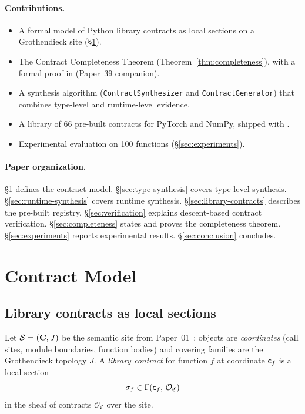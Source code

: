 \documentclass[11pt]{article}
\newcommand{\ContractSpace}{\mathfrak{C}}  %
\newcommand{\nTotal}{66}                   %
\newcommand{\nExp}{100}                    %
\begin{document}
\paragraph{Contributions.}
\begin{itemize}
  \item A formal model of Python library contracts as local sections
    on a Grothendieck site (\S\ref{sec:contract-model}).
  \item The Contract Completeness Theorem
    (Theorem~\ref{thm:completeness}), with a formal proof in \LEAN{}
    (Paper~39 companion).
  \item A synthesis algorithm (\texttt{ContractSynthesizer} and
    \texttt{ContractGenerator}) that combines type-level and
    runtime-level evidence.
  \item A library of \nTotal{} pre-built contracts for PyTorch and NumPy,
    shipped with \JuGeo{}.
  \item Experimental evaluation on \nExp{} functions (\S\ref{sec:experiments}).
\end{itemize}

\paragraph{Paper organization.}
\S\ref{sec:contract-model} defines the contract model.
\S\ref{sec:type-synthesis} covers type-level synthesis.
\S\ref{sec:runtime-synthesis} covers runtime synthesis.
\S\ref{sec:library-contracts} describes the pre-built registry.
\S\ref{sec:verification} explains descent-based contract verification.
\S\ref{sec:completeness} states and proves the completeness theorem.
\S\ref{sec:experiments} reports experimental results.
\S\ref{sec:conclusion} concludes.

\section{Contract Model}\label{sec:contract-model}

\subsection{Library contracts as local sections}

Let $\mathcal{S} = (\mathbf{C}, J)$ be the \JuGeo{} semantic site from
Paper~01~\cite{jugeo01}: objects are \emph{coordinates} (call sites,
module boundaries, function bodies) and covering families are the
Grothendieck topology $J$.  A \emph{library contract} for function $f$
at coordinate $\mathsf{c}_f$ is a local section
\[
  \sigma_f \in \Gamma(\coord_f,\, \mathcal{O}_{\ContractSpace})
\]
in the sheaf of contracts $\mathcal{O}_{\ContractSpace}$ over the site.
\end{document}
